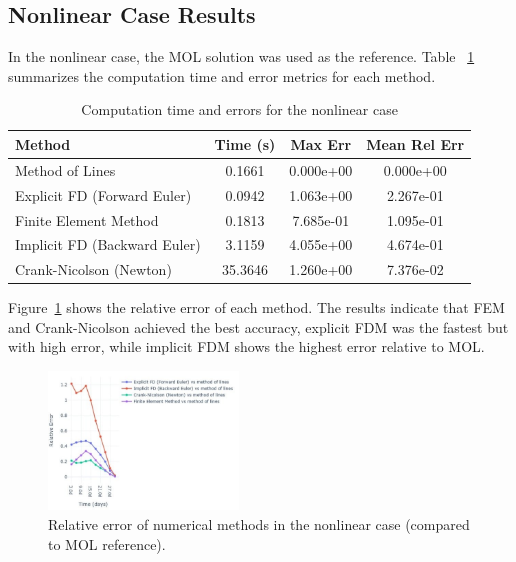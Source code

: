 \documentclass[conference]{IEEEtran}
\begin{document}
\subsection{Nonlinear Case Results}

In the nonlinear case, the MOL solution was used as the reference. Table ~\ref{tab:Nonlinear_results} summarizes the computation time and error metrics for each method.
\begin{table}[h!]
\centering
\footnotesize %
\caption{Computation time and errors for the nonlinear case}
\label{tab:Nonlinear_results}
\begin{tabular}{@{}lccc@{}}
\toprule
\textbf{Method} & \textbf{Time (s)} & \textbf{Max Err} & \textbf{Mean Rel Err} \\
\midrule
Method of Lines & 0.1661 & 0.000e+00 & 0.000e+00 \\
Explicit FD (Forward Euler) & 0.0942 & 1.063e+00 & 2.267e-01 \\
Finite Element Method & 0.1813 & 7.685e-01 & 1.095e-01 \\
Implicit FD (Backward Euler) & 3.1159 & 4.055e+00 & 4.674e-01 \\
Crank-Nicolson (Newton) & 35.3646 & 1.260e+00 & 7.376e-02 \\
\bottomrule
\end{tabular}
\normalsize
\end{table}


Figure~\ref{fig:accuracy_nonlinear} shows the relative error of each method. The results indicate that FEM and Crank-Nicolson achieved the best accuracy, explicit FDM was the fastest but with high error, while implicit FDM shows the highest error relative to MOL.


\begin{figure}[h!]
\centering
\includegraphics[width=0.45\textwidth]{nonlinear.jpg} %
\caption{Relative error of numerical methods in the nonlinear case (compared to MOL reference).}
\label{fig:accuracy_nonlinear}
\end{figure}
\end{document}
